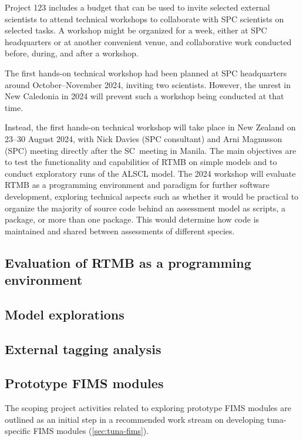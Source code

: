 \documentclass{SCreport}
\begin{document}
Project 123 includes a budget that can be used to invite selected external
scientists to attend technical workshops to collaborate with SPC scientists on
selected tasks. A workshop might be organized for a week, either at SPC
headquarters or at another convenient venue, and collaborative work conducted
before, during, and after a workshop.

The first hands-on technical workshop had been planned at SPC headquarters
around October--November 2024, inviting two scientists. However, the unrest in
New Caledonia in 2024 will prevent such a workshop being conducted at that time.

Instead, the first hands-on technical workshop will take place in New Zealand on
23--30 August 2024, with Nick Davies (SPC consultant) and Arni Magnusson (SPC)
meeting directly after the SC~meeting in Manila. The main objectives are to test
the functionality and capabilities of RTMB on simple models and to conduct
exploratory runs of the ALSCL model. The 2024 workshop will evaluate RTMB as a
programming environment and paradigm for further software development, exploring
technical aspects such as whether it would be practical to organize the majority
of source code behind an assessment model as scripts, a package, or more than
one package. This would determine how code is maintained and shared between
assessments of different species.

\subsection{Evaluation of RTMB as a programming environment}

\subsection{Model explorations}

\subsection{External tagging analysis}

\subsection{Prototype FIMS modules}

The scoping project activities related to exploring prototype FIMS modules are
outlined as an initial step in a recommended work stream on developing
tuna-specific FIMS modules (\autoref{sec:tuna-fims}).
\end{document}
